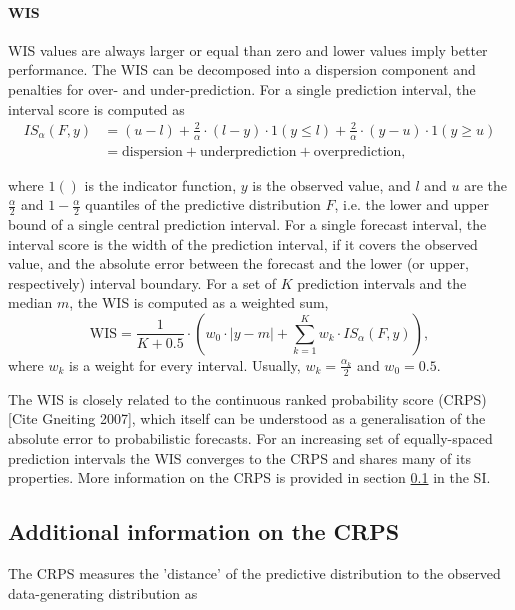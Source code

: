 \documentclass{article}
\begin{document}
\paragraph{WIS}

WIS values are always larger or equal than zero and lower values imply better performance. The WIS can be decomposed into a dispersion component and penalties for over- and under-prediction. For a single prediction interval, the interval score is computed as 
\begin{align}
 IS_\alpha(F,y) &= (u-l) + \frac{2}{\alpha} \cdot (l-y) \cdot 1(y \leq l) + \frac{2}{\alpha} \cdot (y-u) \cdot 1(y \geq u) \\
 &= \text{dispersion} + \text{underprediction} + \text{overprediction},    
\end{align}

where $1()$ is the indicator function, $y$ is the observed value, and $l$ and $u$ are the $\frac{\alpha}{2}$ and $1 - \frac{\alpha}{2}$ quantiles of the predictive distribution $F$, i.e. the lower and upper bound of a single central prediction interval. For a single forecast interval, the interval score is the width of the prediction interval, if it covers the observed value, and the absolute error between the forecast and the lower (or upper, respectively) interval boundary. For a set of $K$ prediction intervals and the median $m$, the WIS is computed as a weighted sum, 
\begin{equation}
\text{WIS} = \frac{1}{K + 0.5} \cdot \left(w_0 \cdot |y - m| + \sum_{k = 1}^{K} w_k \cdot IS_{\alpha}(F, y)\right),    
\end{equation} 
where $w_k$ is a weight for every interval. Usually, $w_k = \frac{\alpha_k}{2}$ and $w_0 = 0.5$. 


The WIS is closely related to the continuous ranked probability score (CRPS) [Cite Gneiting 2007], which itself can be understood as a generalisation of the absolute error to probabilistic forecasts. For an increasing set of equally-spaced prediction intervals the WIS converges to the CRPS and shares many of its properties. More information on the CRPS is provided in section \ref{crps} in the SI. 

\subsection{Additional information on the CRPS} \label{crps}

The CRPS measures the 'distance' of the predictive distribution to the observed data-generating distribution as 
\end{document}
